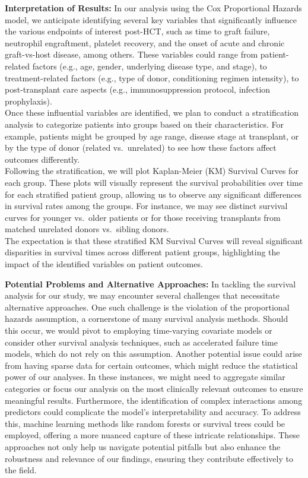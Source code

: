 \documentclass[11pt,]{article}
\begin{document}
\textbf{Interpretation of Results: } In our analysis using the Cox
Proportional Hazards model, we anticipate identifying several key
variables that significantly influence the various endpoints of interest
post-HCT, such as time to graft failure, neutrophil engraftment,
platelet recovery, and the onset of acute and chronic graft-vs-host
disease, among others. These variables could range from patient-related
factors (e.g., age, gender, underlying disease type, and stage), to
treatment-related factors (e.g., type of donor, conditioning regimen
intensity), to post-transplant care aspects (e.g., immunosuppression
protocol, infection prophylaxis).\\
Once these influential variables are identified, we plan to conduct a
stratification analysis to categorize patients into groups based on
their characteristics. For example, patients might be grouped by age
range, disease stage at transplant, or by the type of donor (related
vs.~unrelated) to see how these factors affect outcomes differently.\\
Following the stratification, we will plot Kaplan-Meier (KM) Survival
Curves for each group. These plots will visually represent the survival
probabilities over time for each stratified patient group, allowing us
to observe any significant differences in survival rates among the
groups. For instance, we may see distinct survival curves for younger
vs.~older patients or for those receiving transplants from matched
unrelated donors vs.~sibling donors.\\
The expectation is that these stratified KM Survival Curves will reveal
significant disparities in survival times across different patient
groups, highlighting the impact of the identified variables on patient
outcomes.

\textbf{Potential Problems and Alternative Approaches:} In tackling the
survival analysis for our study, we may encounter several challenges
that necessitate alternative approaches. One such challenge is the
violation of the proportional hazards assumption, a cornerstone of many
survival analysis methods. Should this occur, we would pivot to
employing time-varying covariate models or consider other survival
analysis techniques, such as accelerated failure time models, which do
not rely on this assumption. Another potential issue could arise from
having sparse data for certain outcomes, which might reduce the
statistical power of our analyses. In these instances, we might need to
aggregate similar categories or focus our analysis on the most
clinically relevant outcomes to ensure meaningful results. Furthermore,
the identification of complex interactions among predictors could
complicate the model's interpretability and accuracy. To address this,
machine learning methods like random forests or survival trees could be
employed, offering a more nuanced capture of these intricate
relationships. These approaches not only help us navigate potential
pitfalls but also enhance the robustness and relevance of our findings,
ensuring they contribute effectively to the field.
\end{document}
